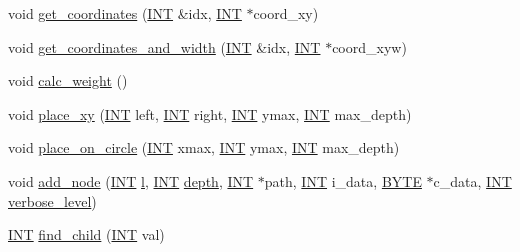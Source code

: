 \begin{DoxyCompactItemize}
\item 
void \mbox{\hyperlink{classtree__node_a4f8b497531ce2914cdb717dc554ccde6}{get\+\_\+coordinates}} (\mbox{\hyperlink{galois_8h_a09fddde158a3a20bd2dcadb609de11dc}{I\+NT}} \&idx, \mbox{\hyperlink{galois_8h_a09fddde158a3a20bd2dcadb609de11dc}{I\+NT}} $\ast$coord\+\_\+xy)
\item 
void \mbox{\hyperlink{classtree__node_a8d71d0fe771485a03975f1d1e224f170}{get\+\_\+coordinates\+\_\+and\+\_\+width}} (\mbox{\hyperlink{galois_8h_a09fddde158a3a20bd2dcadb609de11dc}{I\+NT}} \&idx, \mbox{\hyperlink{galois_8h_a09fddde158a3a20bd2dcadb609de11dc}{I\+NT}} $\ast$coord\+\_\+xyw)
\item 
void \mbox{\hyperlink{classtree__node_a55589ed05940eff3cf850e202e49fdd2}{calc\+\_\+weight}} ()
\item 
void \mbox{\hyperlink{classtree__node_a1229c03fa683790dcaed74831d9ceb81}{place\+\_\+xy}} (\mbox{\hyperlink{galois_8h_a09fddde158a3a20bd2dcadb609de11dc}{I\+NT}} left, \mbox{\hyperlink{galois_8h_a09fddde158a3a20bd2dcadb609de11dc}{I\+NT}} right, \mbox{\hyperlink{galois_8h_a09fddde158a3a20bd2dcadb609de11dc}{I\+NT}} ymax, \mbox{\hyperlink{galois_8h_a09fddde158a3a20bd2dcadb609de11dc}{I\+NT}} max\+\_\+depth)
\item 
void \mbox{\hyperlink{classtree__node_aee82931a4f0abffa5a2daa39624696be}{place\+\_\+on\+\_\+circle}} (\mbox{\hyperlink{galois_8h_a09fddde158a3a20bd2dcadb609de11dc}{I\+NT}} xmax, \mbox{\hyperlink{galois_8h_a09fddde158a3a20bd2dcadb609de11dc}{I\+NT}} ymax, \mbox{\hyperlink{galois_8h_a09fddde158a3a20bd2dcadb609de11dc}{I\+NT}} max\+\_\+depth)
\item 
void \mbox{\hyperlink{classtree__node_a2b97ebc5346b1973cabad7461c0e4cb7}{add\+\_\+node}} (\mbox{\hyperlink{galois_8h_a09fddde158a3a20bd2dcadb609de11dc}{I\+NT}} \mbox{\hyperlink{alphabet2_8_c_a89606eca6b563ec68d2da2e84657736f}{l}}, \mbox{\hyperlink{galois_8h_a09fddde158a3a20bd2dcadb609de11dc}{I\+NT}} \mbox{\hyperlink{classtree__node_aa5529f7dcfe7aeda758c538cb4b5a6e6}{depth}}, \mbox{\hyperlink{galois_8h_a09fddde158a3a20bd2dcadb609de11dc}{I\+NT}} $\ast$path, \mbox{\hyperlink{galois_8h_a09fddde158a3a20bd2dcadb609de11dc}{I\+NT}} i\+\_\+data, \mbox{\hyperlink{galois_8h_ab6cc7b4aeb6ea31aba2b3fbfc83ff5e6}{B\+Y\+TE}} $\ast$c\+\_\+data, \mbox{\hyperlink{galois_8h_a09fddde158a3a20bd2dcadb609de11dc}{I\+NT}} \mbox{\hyperlink{simeon_8_c_a818073fbcc2f439e7c56952f67386122}{verbose\+\_\+level}})
\item 
\mbox{\hyperlink{galois_8h_a09fddde158a3a20bd2dcadb609de11dc}{I\+NT}} \mbox{\hyperlink{classtree__node_a14c6788e5e4e343815c22a8260365509}{find\+\_\+child}} (\mbox{\hyperlink{galois_8h_a09fddde158a3a20bd2dcadb609de11dc}{I\+NT}} val)

\end{DoxyCompactItemize}
